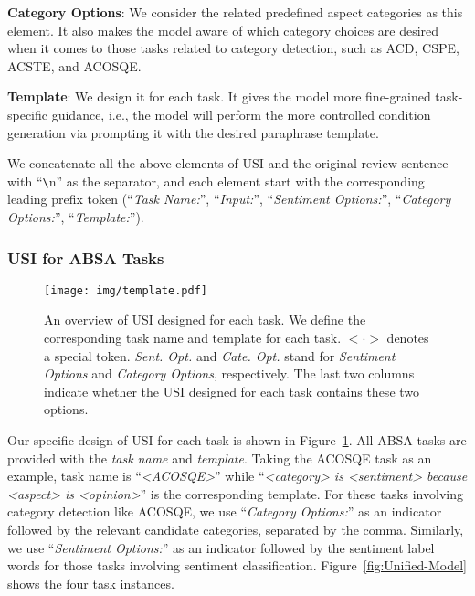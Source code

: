\documentclass[11pt]{article}
\newcommand{\USI}{\textsc{USI}\xspace}
\newcommand{\template}[1]{{\emph{#1}}}
\begin{document}
\noindent\textbf{Category Options}: We consider the related predefined aspect categories as this element. It also makes the model aware of which category choices are desired when it comes to those tasks related to category detection, such as ACD, CSPE, ACSTE, and ACOSQE.

\noindent\textbf{Template}: We design it for each task. It gives the model more fine-grained task-specific guidance, i.e., the model will perform the more controlled condition generation via prompting it with the desired paraphrase template.

We concatenate all the above elements of \USI and the original review sentence with ``\verb|\|n'' as the separator, and each element start with the corresponding leading prefix token (``\template{Task Name:}'', ``\template{Input:}'', ``\template{Sentiment Options:}'', ``\template{Category Options:}'', ``\template{Template:}'').

\subsubsection{USI for ABSA Tasks}
\label{sec:USI-for-ABSA}

\begin{figure}[h]
\centering 
\texttt{[image: img/template.pdf]} 
\caption{An overview of \USI designed for each task. We define the corresponding task name and template for each task. $< \cdot >$ denotes a special token. \emph{Sent. Opt.} and \emph{Cate. Opt.} stand for \emph{Sentiment Options} and \emph{Category Options}, respectively. The last two columns indicate whether the \USI designed for each task contains these two options.} 
\vspace{-3mm}
\label{fig:template-for-all-tasks}
\end{figure}

Our specific design of \USI for each task is shown in Figure~\ref{fig:template-for-all-tasks}. All ABSA tasks are provided with the \emph{task name} and \emph{template}. Taking the ACOSQE task as an example, task name is ``\emph{<ACOSQE>}'' while ``\emph{<category> is <sentiment> because <aspect> is <opinion>}'' is the corresponding template. For these tasks involving category detection like ACOSQE, we use ``\template{Category Options:}'' as an indicator followed by the relevant candidate categories, separated by the comma. Similarly, we use ``\template{Sentiment Options:}'' as an indicator followed by the sentiment label words for those tasks involving sentiment classification.
Figure~\ref{fig:Unified-Model} shows the four task instances.
\end{document}
